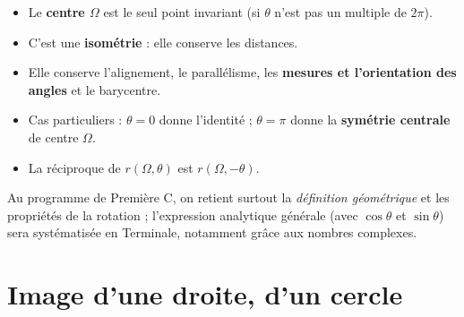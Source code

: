 \begin{propriete}
\begin{itemize}
  \item Le \textbf{centre $\Omega$} est le seul point invariant (si $\theta$ n'est
        pas un multiple de $2\pi$).
  \item C'est une \textbf{isométrie} : elle conserve les distances.
  \item Elle conserve l'alignement, le parallélisme, les \textbf{mesures et
        l'orientation des angles} et le barycentre.
  \item Cas particuliers : $\theta=0$ donne l'identité ; $\theta=\pi$ donne la
        \textbf{symétrie centrale} de centre $\Omega$.
  \item La réciproque de $r(\Omega,\theta)$ est $r(\Omega,-\theta)$.
\end{itemize}
\end{propriete}

\begin{illus}
\end{illus}

\begin{remarque}
Au programme de Première C, on retient surtout la \emph{définition géométrique} et
les propriétés de la rotation ; l'expression analytique générale (avec $\cos\theta$
et $\sin\theta$) sera systématisée en Terminale, notamment grâce aux nombres
complexes.
\end{remarque}

\section{Image d'une droite, d'un cercle}


